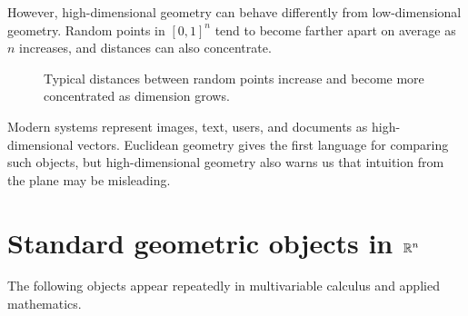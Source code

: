 However, high-dimensional geometry can behave differently from low-dimensional geometry. Random points in $[0,1]^n$ tend to become farther apart on average as $n$ increases, and distances can also concentrate.

\begin{figure}[H]
\centering
{}
\caption{Typical distances between random points increase and become more concentrated as dimension grows.}
\label{fig:high-dimensional-distances}
\end{figure}

\begin{notebox}[title={Connection to artificial intelligence}]
Modern systems represent images, text, users, and documents as high-dimensional vectors. Euclidean geometry gives the first language for comparing such objects, but high-dimensional geometry also warns us that intuition from the plane may be misleading.
\end{notebox}

\section{Standard geometric objects in $\mathbb{R}^n$}

The following objects appear repeatedly in multivariable calculus and applied mathematics.

